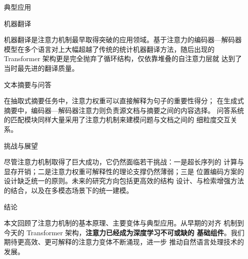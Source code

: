 \documentclass[12pt]{article}
\begin{document}
\par\vskip 20pt{\zhhei 典型应用\par}\vskip 10pt

\par\vskip 14pt{\zhhei 机器翻译\par}\vskip 8pt

机器翻译是注意力机制最早取得突破的应用领域。基于注意力的编码器—解码器
模型在多个语言对上大幅超越了传统的统计机器翻译方法，随后出现的
Transformer 架构更是完全抛弃了循环结构，仅依靠堆叠的自注意力层就
达到了当时最先进的翻译质量。

\par\vskip 14pt{\zhhei 文本摘要与问答\par}\vskip 8pt

在抽取式摘要任务中，注意力权重可以直接解释为句子的重要性得分；
在生成式摘要中，编码器—解码器注意力则负责源文档与摘要之间的内容选择。
问答系统的匹配模块同样大量采用了注意力机制来建模问题与文档之间的
细粒度交互关系。

\par\vskip 20pt{\zhhei 挑战与展望\par}\vskip 10pt

尽管注意力机制取得了巨大成功，它仍然面临若干挑战：一是超长序列的
计算与显存开销；二是注意力权重可解释性的理论支撑仍然薄弱；三是
位置编码方案的设计缺乏统一的原则。未来的研究方向包括更高效的结构
设计、与检索增强方法的结合，以及在多模态场景下的统一建模。

\par\vskip 20pt{\zhhei 结论\par}\vskip 10pt

本文回顾了注意力机制的基本原理、主要变体与典型应用。从早期的对齐
机制到今天的 Transformer 架构，\textbf{注意力已经成为深度学习不可或缺的
基础组件}。我们期待更高效、更可解释的注意力变体不断涌现，进一步
推动自然语言处理技术的发展。
\end{document}
